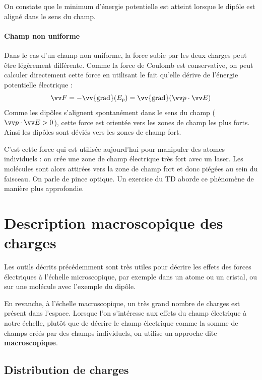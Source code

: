 \documentclass[11pt,fleqn]{book} %
\newcommand{\grad}{\vv{\mathrm{grad}}}
\begin{document}
On constate que le minimum d'énergie potentielle est atteint lorsque le dipôle est aligné dans le sens du champ.


\paragraph{Champ non uniforme}

Dans le cas d'un champ non uniforme, la force subie par les deux charges peut être légèrement différente. Comme la force de Coulomb est conservative, on peut calculer directement cette force en utilisant le fait qu'elle dérive de l'énergie potentielle électrique :
\begin{equation}
    \vv F = - \grad(E_p) = \grad(\vv p \cdot \vv E)
\end{equation}
Comme les dipôles s'alignent spontanément dans le sens du champ ($\vv p \cdot \vv E > 0$), cette force est orientée vers les zones de champ les plus forts. Ainsi les dipôles sont déviés vers les zones de champ fort.

\begin{remark}
    C'est cette force qui est utilisée aujourd'hui pour manipuler des atomes individuels : on crée une zone de champ électrique très fort avec un laser. Les molécules sont alors attirées vers la zone de champ fort et donc piégées au sein du faisceau. On parle de pince optique. Un exercice du TD aborde ce phénomène de manière plus approfondie.
\end{remark}

\section{Description macroscopique des charges}

Les outils décrits précédemment sont très utiles pour décrire les effets des forces électriques à l'échelle microscopique, par exemple dans un atome ou un cristal, ou sur une molécule avec l'exemple du dipôle.

En revanche, à l'échelle macroscopique, un très grand nombre de charges est présent dans l'espace. Lorsque l'on s'intéresse aux effets du champ électrique à notre échelle, plutôt que de décrire le champ électrique comme la somme de champs créés par des champs individuels, on utilise un approche dite \textbf{macroscopique}.

\subsection{Distribution de charges}
\end{document}
